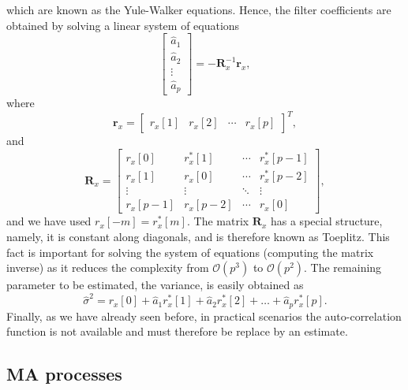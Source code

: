 which are known as the Yule-Walker equations. Hence, the filter coefficients are obtained by solving a linear system of equations
\begin{equation*}
\begin{bmatrix}
\hat{a}_1 \\ \hat{a}_2 \\ \vdots \\ \hat{a}_p
\end{bmatrix} = - \mathbf{R}_x^{-1} \mathbf{r}_x,
\end{equation*}
where 
\begin{equation*}
\mathbf{r}_x = \begin{bmatrix}
r_x[1] & r_x[2] & \cdots & r_x[p]
\end{bmatrix}^T,
\end{equation*}
and
\begin{equation*}
\mathbf{R}_x  =\begin{bmatrix}
r_x[0] & r_x^{\ast}[1] & \cdots & r_x^{\ast}[p-1] \\
r_x[1] & r_x[0] & \cdots & r_x^{\ast}[p-2] \\
\vdots & \vdots & \ddots & \vdots \\
r_x[p-1] & r_x[p-2] & \cdots & r_x[0] 
\end{bmatrix},
\end{equation*}
and we have used $r_{x}[-m] = r_{x}^{\ast}[m]$. The matrix $\mathbf{R}_x$ has a special structure, namely, it is constant along diagonals, and is therefore known as Toeplitz. This fact is important for solving the system of equations (computing the matrix inverse) as it reduces the complexity from $\mathcal{O}(p^3)$ to $\mathcal{O}(p^2)$. The remaining parameter to be estimated, the variance, is easily obtained as
\begin{equation*}
\hat{\sigma}^2 = r_x[0] + \hat{a}_1 r_x^{\ast}[1] + \hat{a}_2 r_x^{\ast}[2] + \ldots + \hat{a}_p r_x^{\ast}[p].
\end{equation*}
Finally, as we have already seen before, in practical scenarios the auto-correlation function is not available and must therefore be replace by an estimate.

\subsection{MA processes}


